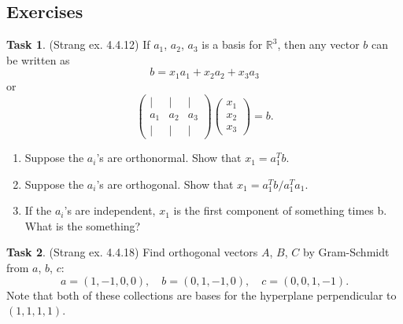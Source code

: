 \documentclass[10pt,]{book}
\theoremstyle{plain}
\theoremstyle{definition}
\numberwithin{equation}{section}
\newtheorem{task}{Task}[chapter]
\begin{document}
\subsection[Exercises]{Exercises}\label{subsection-112}
\begin{task}
\label{task-139}
(Strang ex. 4.4.12)
        If \(a_1\), \(a_2\), \(a_3\) is a basis for \(\mathbb{R}^3\),
        then any vector \(b\) can be written as
        \[
          b = x_1 a_1 + x_2 a_2 + x_3 a_3
        \]
        or
        \[
          \begin{pmatrix} | & | & | \\ a_1 & a_2 & a_3 \\
          | & | & | \end{pmatrix}\begin{pmatrix} x_1 \\ x_2 \\ x_3
          \end{pmatrix} = b.
        \]\begin{enumerate}
\item{}
            Suppose the \(a_i\)'s are orthonormal.
            Show that \(x_1 = a_1^T b\).
          \item{}
            Suppose the \(a_i\)'s are orthogonal.
            Show that \(x_1 = a_1^T b / a_1^T a_1\).
          \item{}
            If the \(a_i\)'s are independent, \(x_1\) is the first component of
            something times b. What is the something?
          \end{enumerate}
\end{task}
\begin{task}
\label{task-140}
(Strang ex. 4.4.18)
        Find orthogonal vectors \(A\), \(B\), \(C\) by Gram-Schmidt from
        \(a\), \(b\), \(c\):
        \[
          a = (1,-1,0,0), \quad b = (0,1,-1,0), \quad c = (0,0,1,-1).
        \]
        Note that both of these collections are bases for the hyperplane perpendicular
        to \((1,1,1,1)\).
      \end{task}
\end{document}
